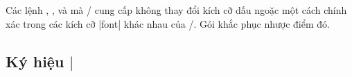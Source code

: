 \documentclass[11pt,leqno,titlepage,openany,oneside]{amsldoc}[1999/12/13]
\begin{document}
\medskip
Các lệnh , ,  và  mà \latex/ cung cấp
không thay đổi kích cỡ dấu ngoặc một cách chính xác trong các kích cỡ |font|
khác nhau của \latex/. Gói  khắc phục nhược điểm đó.

\subsection{Ký hiệu $\rvert$}
\end{document}
